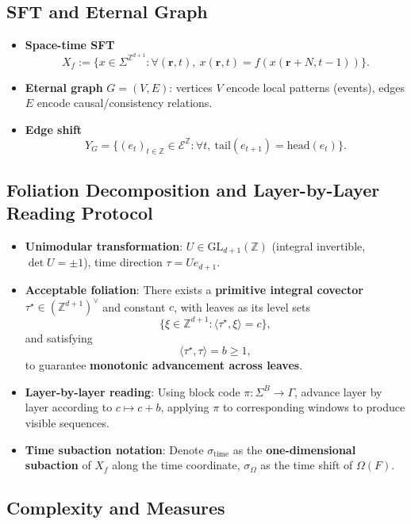 \documentclass[11pt]{article}
\theoremstyle{definition}
\theoremstyle{remark}
\begin{document}
\subsection{SFT and Eternal Graph}

\begin{itemize}
\item \textbf{Space-time SFT}
\[
X_f := \{x \in \Sigma^{\mathbb{Z}^{d+1}} : \forall (\mathbf{r}, t), \ x(\mathbf{r}, t) = f(x(\mathbf{r} + N, t-1))\}.
\]
\item \textbf{Eternal graph} \( G = (V, E) \): vertices \( V \) encode local patterns (events), edges \( E \) encode causal/consistency relations.
\item \textbf{Edge shift}
\[
Y_G = \{(e_t)_{t \in \mathbb{Z}} \in \mathcal{E}^{\mathbb{Z}} : \forall t, \ \mathrm{tail}(e_{t+1}) = \mathrm{head}(e_t)\}.
\]
\end{itemize}

\subsection{Foliation Decomposition and Layer-by-Layer Reading Protocol}

\begin{itemize}
\item \textbf{Unimodular transformation}: \( U \in \mathrm{GL}_{d+1}(\mathbb{Z}) \) (integral invertible, \( \det U = \pm 1 \)), time direction \( \tau = U e_{d+1} \).
\item \textbf{Acceptable foliation}: There exists a \textbf{primitive integral covector} \( \tau^\star \in (\mathbb{Z}^{d+1})^\vee \) and constant \( c \), with leaves as its level sets
\[
\{\xi \in \mathbb{Z}^{d+1} : \langle \tau^\star, \xi \rangle = c\},
\]
and satisfying
\[
\langle \tau^\star, \tau \rangle = b \geq 1,
\]
to guarantee \textbf{monotonic advancement across leaves}.
\item \textbf{Layer-by-layer reading}: Using block code \( \pi: \Sigma^B \to \Gamma \), advance layer by layer according to \( c \mapsto c + b \), applying \( \pi \) to corresponding windows to produce visible sequences.
\item \textbf{Time subaction notation}: Denote \( \sigma_{\mathrm{time}} \) as the \textbf{one-dimensional subaction} of \( X_f \) along the time coordinate, \( \sigma_\Omega \) as the time shift of \( \Omega(F) \).
\end{itemize}

\subsection{Complexity and Measures}
\end{document}
